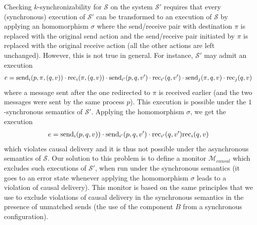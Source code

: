 Checking $k$-synchronizability for $\mathcal{S}$ on the system $\mathcal{S'}$ requires that every (synchronous) execution of $\mathcal{S'}$ can be transformed to an execution of $\mathcal{S}$ by applying an homomorphism $\sigma$ where the send/receive pair with destination $\pi$ is replaced with the original send action and the send/receive pair initiated by $\pi$ is replaced with the original receive action (all the other actions are left unchanged). However, this is not true in general. For instance, $\mathcal{S'}$ may admit an execution 
\begin{align*}
e=\mathrm{send}_{i}({p,\pi,(q,v)})\cdot \mathrm{rec}_{i}({\pi,(q,v)})\cdot \mathrm{send}_{i'}({p,q,v'})\cdot \mathrm{rec}_{i'}({q,v'})\cdot \mathrm{send}_{j}({\pi,q,v})\cdot \mathrm{rec}_{j}({q,v})
\end{align*}
where a message sent after the one redirected to $\pi$ is received earlier (and the two messages were sent by the same process $p$). This execution is possible under the $1$-synchronous semantics of $\mathcal{S'}$. Applying the homomorphism $\sigma$, we get the execution 
\begin{align*}
e=\mathrm{send}_{i}({p,q,v)})\cdot \mathrm{send}_{i'}({p,q,v'})\cdot \mathrm{rec}_{i'}({q,v'})\mathrm{rec}_{i}({q,v})
\end{align*}
which violates causal delivery and it is thus not possible under the asynchronous semantics of $\mathcal{S}$.
Our solution to this problem is to define a monitor $\mathcal{M}_{\mathit{causal}}$ which excludes such executions of $\mathcal{S'}$, when run under the synchronous semantics (it goes to an error state whenever applying the homomorphism $\sigma$ leads to a violation of causal delivery). This monitor is based on the same principles that we use to exclude violations of causal delivery in the synchronous semantics in the presence of unmatched sends (the use of the component $B$ from a synchronous configuration).

